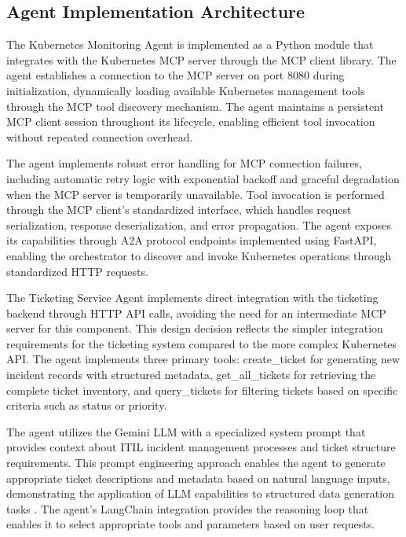 \documentclass{article}
\begin{document}
\subsection{Agent Implementation Architecture}

The Kubernetes Monitoring Agent is implemented as a Python module that integrates with the Kubernetes MCP server through the MCP client library. The agent establishes a connection to the MCP server on port 8080 during initialization, dynamically loading available Kubernetes management tools through the MCP tool discovery mechanism. The agent maintains a persistent MCP client session throughout its lifecycle, enabling efficient tool invocation without repeated connection overhead.

The agent implements robust error handling for MCP connection failures, including automatic retry logic with exponential backoff and graceful degradation when the MCP server is temporarily unavailable. Tool invocation is performed through the MCP client's standardized interface, which handles request serialization, response deserialization, and error propagation. The agent exposes its capabilities through A2A protocol endpoints implemented using FastAPI, enabling the orchestrator to discover and invoke Kubernetes operations through standardized HTTP requests.

The Ticketing Service Agent implements direct integration with the ticketing backend through HTTP API calls, avoiding the need for an intermediate MCP server for this component. This design decision reflects the simpler integration requirements for the ticketing system compared to the more complex Kubernetes API. The agent implements three primary tools: create\_ticket for generating new incident records with structured metadata, get\_all\_tickets for retrieving the complete ticket inventory, and query\_tickets for filtering tickets based on specific criteria such as status or priority.

The agent utilizes the Gemini LLM with a specialized system prompt that provides context about ITIL incident management processes and ticket structure requirements. This prompt engineering approach enables the agent to generate appropriate ticket descriptions and metadata based on natural language inputs, demonstrating the application of LLM capabilities to structured data generation tasks \cite{liu2024}. The agent's LangChain integration provides the reasoning loop that enables it to select appropriate tools and parameters based on user requests.
\end{document}
